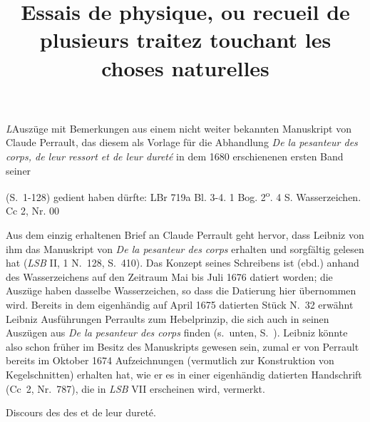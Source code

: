 \begin{Ueberlieferung}%
{\textit{L}}Auszüge mit Bemerkungen aus einem nicht weiter bekannten Manuskript von Claude Perrault\protect{}, das diesem als Vorlage für die Abhandlung \textit{De la pesanteur des corps, de leur ressort et de leur dureté} in dem 1680 erschienenen ersten Band seiner \cite{01016}\title{Essais de physique, ou recueil de plusieurs traitez touchant les choses naturelles} (S.~1-128) gedient haben dürfte:
LBr 719a Bl. 3-4. 1 Bog. 2\textsuperscript{o}. 4 S. Wasserzeichen.%
\newline%
Cc 2, Nr. 00
\end{Ueberlieferung}
\vspace*{5mm}
\begin{Datierungsgruende}%
Aus dem einzig erhaltenen Brief an Claude Perrault geht hervor, dass Leibniz von ihm das Manuskript von \textit{De la pesanteur des corps} erhalten und sorgfältig gelesen hat (\cite{01017}\textit{LSB} II, 1 N.~128, S.~410). Das Konzept seines Schreibens ist (ebd.) anhand des Wasserzeichens auf den Zeitraum Mai bis Juli 1676 datiert worden; die Auszüge haben dasselbe Wasserzeichen, so dass die Datierung hier übernommen wird. 
Bereits in dem eigenhändig auf April 1675 datierten Stück N.~32 erwähnt Leibniz
 Aus\-führungen Perraults zum Hebelprinzip,
die sich auch in seinen Auszügen aus \textit{De la pesanteur des corps} finden (s.~unten, S.~). Leibniz könnte also schon früher im Besitz des Manuskripts gewesen sein, zumal er von Perrault bereits im Oktober 1674 Aufzeichnungen (vermutlich zur Konstruktion von Kegelschnitten) erhalten hat, wie er es in einer eigenhändig datierten Handschrift (Cc~2, Nr.~787), die in \textit{LSB} VII erscheinen wird, vermerkt.
\end{Datierungsgruende}%
%
\count{}
\count{}
\count{}
\pstartfirst 
[3~r\textsuperscript{o}]
\pend%
\pstart\noindent\centering%
Discours des 
des 
et de leur duret\'{e}.
